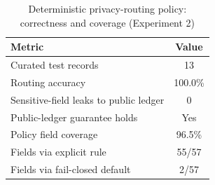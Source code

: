 \begin{table}[htbp]
\centering
\caption{Deterministic privacy-routing policy: correctness and coverage (Experiment 2)}
\label{tab:privacy_policy}
\begin{tabular}{lc}
\toprule
\textbf{Metric} & \textbf{Value} \\
\midrule
Curated test records & 13 \\
Routing accuracy & 100.0\% \\
Sensitive-field leaks to public ledger & 0 \\
Public-ledger guarantee holds & Yes \\
Policy field coverage & 96.5\% \\
Fields via explicit rule & 55/57 \\
Fields via fail-closed default & 2/57 \\
\bottomrule
\end{tabular}
\end{table}

